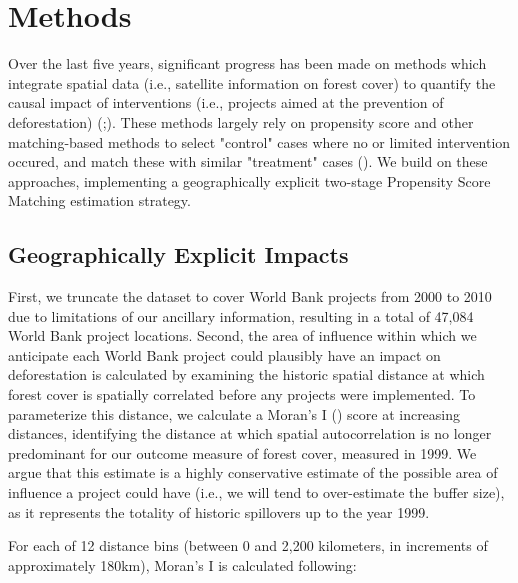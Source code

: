 \documentclass{article}\usepackage[]{graphicx}\usepackage[]{color}
\newenvironment{knitrout}{}{}  %
\begin{document}
\begin{knitrout}
\section{Methods}
Over the last five years, significant progress has been made on methods which integrate spatial data (i.e., satellite information on forest cover) to quantify the causal impact of interventions (i.e., projects aimed at the prevention of deforestation) (\cite{buntaine_titling_2015};\cite{nelson_effectiveness_2011}).  
These methods largely rely on propensity score and other matching-based methods to select "control" cases where no or limited intervention occured, and match these with similar "treatment" cases (\cite{andam_measuring_2008}). 
We build on these approaches, implementing a geographically explicit two-stage Propensity Score Matching estimation strategy. 
\subsection{Geographically Explicit Impacts}
First, we truncate the dataset to cover World Bank projects from 2000 to 2010 due to limitations of our ancillary information, resulting in a total of 47,084 World Bank project locations.
Second, the area of influence within which we anticipate each World Bank project could plausibly have an impact on deforestation is calculated by examining the historic spatial distance at which forest cover is spatially correlated before any projects were implemented. To parameterize this distance, we calculate a Moran’s I (\cite{getis_the_1992}) score at increasing distances, identifying the distance at which spatial autocorrelation is no longer predominant for our outcome measure of forest cover, measured in 1999.  
We argue that this estimate is a highly conservative estimate of the possible area of influence a project could have (i.e., we will tend to over-estimate the buffer size), as it represents the totality of historic spillovers up to the year 1999.
\par
For each of 12 distance bins (between 0 and 2,200 kilometers, in increments of approximately 180km), Moran’s I is calculated following:


\end{knitrout}
\end{document}
